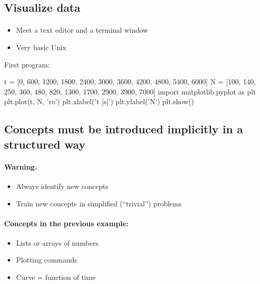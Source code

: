 \documentclass[%
twoside,                 %
final,                   %
10pt]{article}
\begin{document}
\subsection{Visualize data}


\paragraph{}
\begin{itemize}
 \item Meet a text editor and a terminal window

 \item Very basic Unix
\end{itemize}

\noindent
First program:

\bpypro
t = [0, 600, 1200, 1800, 2400, 3000, 3600,
     4200, 4800, 5400, 6000]
N = [100, 140, 250, 360, 480, 820, 1300, 1700, 2900, 3900, 7000]
import matplotlib.pyplot as plt
plt.plot(t, N, 'ro')
plt.xlabel('t [s]')
plt.ylabel('N')
plt.show()
\epypro




\subsection{Concepts must be introduced implicitly in a structured way}


\paragraph{Warning.}
\begin{itemize}
 \item Always identify new concepts

 \item Train new concepts in simplified (``trivial'') problems
\end{itemize}

\noindent




\paragraph{Concepts in the previous example:}
\begin{itemize}
 \item Lists or arrays of numbers

 \item Plotting commands

 \item Curve = function of time
\end{itemize}
\end{document}
